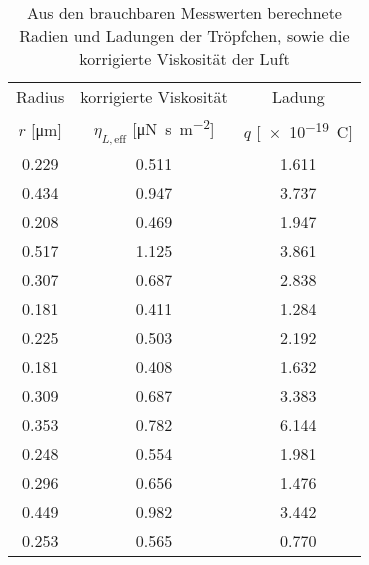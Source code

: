 \begin{table}[!h]
	\centering
	\begin{tabular}{|c|c|c|}
		\hline
		Radius & korrigierte Viskosität & Ladung\\
		$r$ [\si{\micro\meter}] & $\eta_{L,\text{eff}}$ [\si{\micro\newton\second\per\square\meter}] & $q$ [\SI{e-19}{\coulomb}]\\
\hline\hline
		\num{0.229} & \num{0.511} & \num{1.611}\\
		\num{0.434} & \num{0.947} & \num{3.737}\\
		\num{0.208} & \num{0.469} & \num{1.947}\\
		\num{0.517} & \num{1.125} & \num{3.861}\\
		\num{0.307} & \num{0.687} & \num{2.838}\\
		\num{0.181} & \num{0.411} & \num{1.284}\\
		\num{0.225} & \num{0.503} & \num{2.192}\\
		\num{0.181} & \num{0.408} & \num{1.632}\\
		\num{0.309} & \num{0.687} & \num{3.383}\\
		\num{0.353} & \num{0.782} & \num{6.144}\\
		\num{0.248} & \num{0.554} & \num{1.981}\\
		\num{0.296} & \num{0.656} & \num{1.476}\\
		\num{0.449} & \num{0.982} & \num{3.442}\\
		\num{0.253} & \num{0.565} & \num{0.770}\\
		\hline
	\end{tabular}
	\caption{Aus den brauchbaren Messwerten berechnete Radien und Ladungen der Tröpfchen, sowie die korrigierte Viskosität der Luft \label{tab:Auswertung_Ergebnisse2}}
\end{table}
